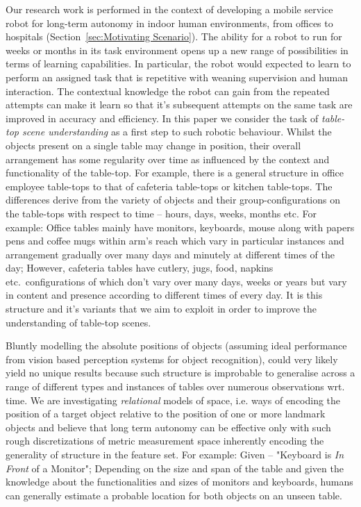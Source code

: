 \documentclass[letterpaper, 10 pt, conference]{ieeeconf}  %
\begin{document}
Our research work is performed in the context of developing a mobile service robot for long-term autonomy in indoor human environments, from offices to hospitals (Section~\ref{sec:Motivating Scenario}). 
The ability for a robot to run for weeks or months in its task environment opens up a new range of possibilities in terms of learning capabilities. In particular, the robot would expected to learn to perform an assigned task that is repetitive with weaning supervision and human interaction. The contextual knowledge the robot can gain from the repeated attempts can make it learn so that it's subsequent attempts on the same task are improved in accuracy and efficiency. 
In this paper we consider the task of \emph{table-top scene understanding} as a first step to such robotic behaviour. Whilst the objects present on a single table may change in position, their overall arrangement has some regularity over time as influenced by the context and functionality of the table-top. For example, there is a general structure in office employee table-tops to that of cafeteria table-tops or kitchen table-tops. The differences derive from the variety of objects and their group-configurations on the table-tops with respect to time -- hours, days, weeks, months etc. For example: Office tables mainly have monitors, keyboards, mouse along with papers pens and coffee mugs within arm's reach which vary in particular instances and arrangement gradually over many days and minutely at different times of the day; However, cafeteria tables have cutlery, jugs, food, napkins etc.\ configurations of which don't vary over many days, weeks or years but vary in content and presence according to different times of every day.
It is this structure and it's variants that we aim to exploit in order to improve the understanding of table-top scenes.

Bluntly modelling the absolute positions of objects (assuming ideal performance from vision based perception systems for object recognition), could very likely yield no unique results because such structure is improbable to generalise across a range of different types and instances of tables over numerous observations wrt. time. We are investigating \emph{relational} models of space, i.e. ways of encoding the position of a target object relative to the position of one or more landmark objects and believe that long term autonomy can be effective only with such rough discretizations of metric measurement space inherently encoding the generality of structure in the feature set. For example: Given -- "Keyboard is \textit{In Front} of a Monitor"; Depending on the size and span of the table and given the knowledge about the functionalities and sizes of monitors and keyboards, humans can generally estimate a probable location for both objects on an unseen table.
\end{document}
